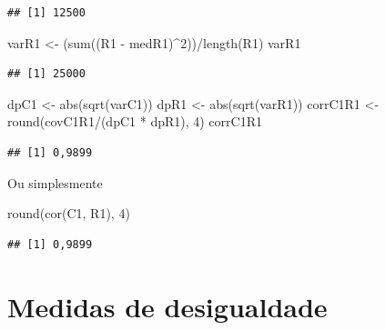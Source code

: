 \documentclass[
]{book}
\newenvironment{Shaded}{\begin{snugshade}}{\end{snugshade}}
\newcommand{\DecValTok}[1]{\textcolor[rgb]{0.00,0.00,0.81}{#1}}
\newcommand{\FunctionTok}[1]{\textcolor[rgb]{0.00,0.00,0.00}{#1}}
\newcommand{\NormalTok}[1]{#1}
\newcommand{\OtherTok}[1]{\textcolor[rgb]{0.56,0.35,0.01}{#1}}
\newcommand{\SpecialCharTok}[1]{\textcolor[rgb]{0.00,0.00,0.00}{#1}}
\begin{document}
\begin{verbatim}
## [1] 12500
\end{verbatim}

\begin{Shaded}
\begin{Highlighting}[]
\NormalTok{varR1 }\OtherTok{\textless{}{-}}\NormalTok{ (}\FunctionTok{sum}\NormalTok{((R1 }\SpecialCharTok{{-}}\NormalTok{ medR1)}\SpecialCharTok{\^{}}\DecValTok{2}\NormalTok{))}\SpecialCharTok{/}\FunctionTok{length}\NormalTok{(R1)}
\NormalTok{varR1}
\end{Highlighting}
\end{Shaded}

\begin{verbatim}
## [1] 25000
\end{verbatim}

\begin{Shaded}
\begin{Highlighting}[]
\NormalTok{dpC1 }\OtherTok{\textless{}{-}} \FunctionTok{abs}\NormalTok{(}\FunctionTok{sqrt}\NormalTok{(varC1))}
\NormalTok{dpR1 }\OtherTok{\textless{}{-}} \FunctionTok{abs}\NormalTok{(}\FunctionTok{sqrt}\NormalTok{(varR1))}
\NormalTok{corrC1R1 }\OtherTok{\textless{}{-}} \FunctionTok{round}\NormalTok{(covC1R1}\SpecialCharTok{/}\NormalTok{(dpC1 }\SpecialCharTok{*}\NormalTok{ dpR1), }\DecValTok{4}\NormalTok{)}
\NormalTok{corrC1R1}
\end{Highlighting}
\end{Shaded}

\begin{verbatim}
## [1] 0,9899
\end{verbatim}

Ou simplesmente

\begin{Shaded}
\begin{Highlighting}[]
\FunctionTok{round}\NormalTok{(}\FunctionTok{cor}\NormalTok{(C1, R1), }\DecValTok{4}\NormalTok{)}
\end{Highlighting}
\end{Shaded}

\begin{verbatim}
## [1] 0,9899
\end{verbatim}

\hypertarget{medidas-de-desigualdade}{%
\chapter{Medidas de desigualdade}\label{medidas-de-desigualdade}}
\end{document}
